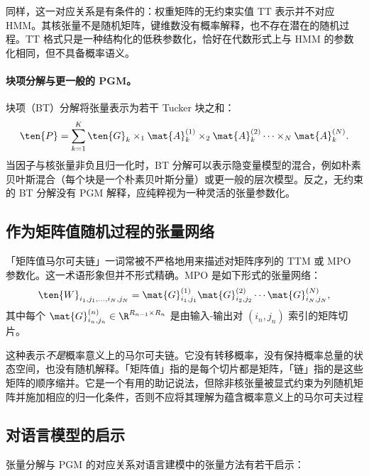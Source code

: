 同样，这一对应关系是有条件的：权重矩阵的无约束实值 TT 表示并不对应 HMM。其核张量不是随机矩阵，键维数没有概率解释，也不存在潜在的随机过程。TT 格式只是一种结构化的低秩参数化，恰好在代数形式上与 HMM 的参数化相同，但不具备概率语义。

\paragraph{块项分解与更一般的 PGM。}
块项（BT）分解将张量表示为若干 Tucker 块之和：
\begin{equation}
\ten{P} = \sum_{k=1}^{K} \ten{G}_k \times_1 \mat{A}^{(1)}_k \times_2 \mat{A}^{(2)}_k \cdots \times_N \mat{A}^{(N)}_k.
\end{equation}
当因子与核张量非负且归一化时，BT 分解可以表示隐变量模型的混合，例如朴素贝叶斯混合（每个块是一个朴素贝叶斯分量）或更一般的层次模型。反之，无约束的 BT 分解没有 PGM 解释，应纯粹视为一种灵活的张量参数化。

\subsection{作为矩阵值随机过程的张量网络}

「矩阵值马尔可夫链」一词常被不严格地用来描述对矩阵序列的 TTM 或 MPO 参数化。这一术语形象但并不形式精确。MPO 是如下形式的张量网络：
\begin{equation}
\ten{W}_{i_1,j_1,\dots,i_N,j_N} = \mat{G}^{(1)}_{i_1,j_1} \mat{G}^{(2)}_{i_2,j_2} \cdots \mat{G}^{(N)}_{i_N,j_N},
\end{equation}
其中每个 $\mat{G}^{(n)}_{i_n,j_n} \in \R^{R_{n-1} \times R_n}$ 是由输入-输出对 $(i_n, j_n)$ 索引的矩阵切片。

这种表示\emph{不是}概率意义上的马尔可夫链。它没有转移概率，没有保持概率总量的状态空间，也没有随机解释。「矩阵值」指的是每个切片都是矩阵，「链」指的是这些矩阵的顺序缩并。它是一个有用的助记说法，但除非核张量被显式约束为列随机矩阵并施加相应的归一化条件，否则不应将其理解为蕴含概率意义上的马尔可夫过程

\subsection{对语言模型的启示}

张量分解与 PGM 的对应关系对语言建模中的张量方法有若干启示：

